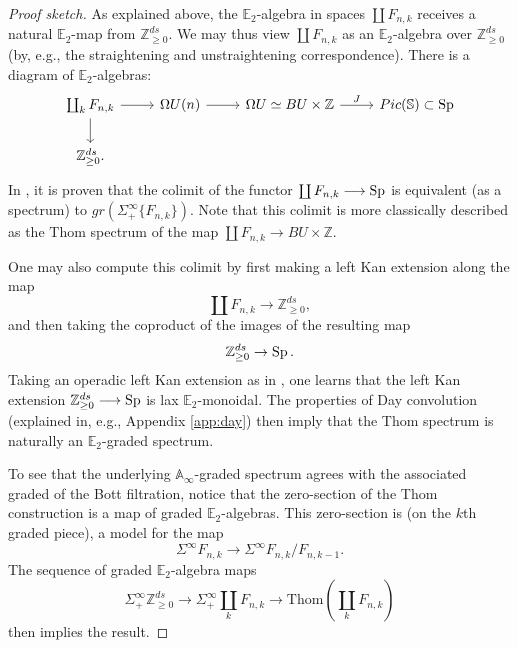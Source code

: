 \begin{proof}[Proof sketch]
As explained above, the $\mathbb{E}_2$-algebra in spaces $\coprod F_{n,k}$ receives a natural $\mathbb{E}_2$-map from $\mathbb{Z}^{ds}_{\ge 0}$.  We may thus view $\coprod F_{n,k}$ as an $\mathbb{E}_2$-algebra over $\mathbb{Z}^{ds}_{\ge 0}$ (by, e.g., the straightening and unstraightening correspondence).  There is a diagram of $\mathbb{E}_2$-algebras:
$$
\begin{tikzcd}
\coprod_k F_{n,k} \arrow{d} \arrow{r} & \Omega U(n) \arrow{r} & \Omega U \simeq BU \times \mathbb{Z} \arrow{r}{J} & Pic(\mathbb{S}) \subset \Sp \\
\mathbb{Z}^{ds}_{\ge 0}.
\end{tikzcd}
$$
In \cite[1.7]{Segal}, it is proven that the colimit of the functor $\coprod F_{n,k} \longrightarrow \operatorname{\mathrm{Sp}}$ is equivalent (as a spectrum) to $gr(\Sigma^{\infty}_+ \{F_{n,k}\})$.  Note that this colimit is more classically described as the Thom spectrum of the map $\coprod F_{n,k} \longrightarrow BU \times \mathbb{Z}$.

One may also compute this colimit by first making a left Kan extension along the map $$\coprod F_{n,k} \rightarrow \mathbb{Z}^{ds}_{\ge 0},$$ and then taking the coproduct of the images of the resulting map $$\mathbb{Z}^{ds}_{\ge 0} \rightarrow \operatorname{\mathrm{Sp}}.$$  Taking an operadic left Kan extension as in \cite[3.1.2]{HA}, one learns that the left Kan extension $\mathbb{Z}^{ds}_{\ge 0} \longrightarrow \operatorname{\mathrm{Sp}}$ is lax $\mathbb{E}_2$-monoidal.  The properties of Day convolution (explained in, e.g., Appendix \ref{app:day}) then imply that the Thom spectrum is naturally an $\mathbb{E}_2$-graded spectrum.

To see that the underlying $\mathbb{A}_\infty$-graded spectrum agrees with the associated graded of the Bott filtration, notice that the zero-section of the Thom construction is a map of graded $\mathbb{E}_2$-algebras.  This zero-section is (on the $k$th graded piece), a model for the map $$\Sigma^{\infty} F_{n,k} \longrightarrow \Sigma^{\infty} F_{n,k}/F_{n,k-1}.$$
The sequence of graded $\mathbb{E}_2$-algebra maps
$$\Sigma^{\infty}_+ \mathbb{Z}^{ds}_{\ge 0} \longrightarrow \Sigma^{\infty}_+ \coprod_k F_{n,k} \longrightarrow \text{Thom}\left( \coprod_k F_{n,k} \right)$$
then implies the result.
\end{proof}